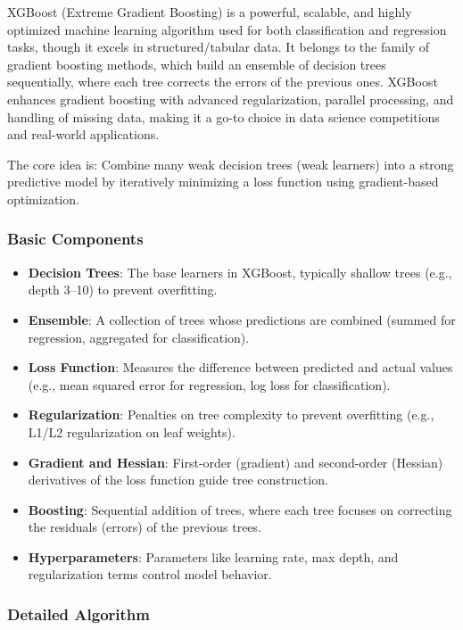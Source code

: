 XGBoost (Extreme Gradient Boosting) is a powerful, scalable, and highly optimized machine learning algorithm used for both classification and regression tasks, though it excels in structured/tabular data.
It belongs to the family of gradient boosting methods, which build an ensemble of decision trees sequentially, where each tree corrects the errors of the previous ones.
XGBoost enhances gradient boosting with advanced regularization, parallel processing, and handling of missing data, making it a go-to choice in data science competitions and real-world applications.

The core idea is: Combine many weak decision trees (weak learners) into a strong predictive model by iteratively minimizing a loss function using gradient-based optimization.

\subsubsection{Basic Components}
\begin{itemize}
    \item \textbf{Decision Trees}: The base learners in XGBoost, typically shallow trees (e.g., depth 3–10) to prevent overfitting.
    \item \textbf{Ensemble}: A collection of trees whose predictions are combined (summed for regression, aggregated for classification).
    \item \textbf{Loss Function}: Measures the difference between predicted and actual values (e.g., mean squared error for regression, log loss for classification).
    \item \textbf{Regularization}: Penalties on tree complexity to prevent overfitting (e.g., L1/L2 regularization on leaf weights).
    \item \textbf{Gradient and Hessian}: First-order (gradient) and second-order (Hessian) derivatives of the loss function guide tree construction.
    \item \textbf{Boosting}: Sequential addition of trees, where each tree focuses on correcting the residuals (errors) of the previous trees.
    \item \textbf{Hyperparameters}: Parameters like learning rate, max depth, and regularization terms control model behavior.
\end{itemize}

\subsubsection{Detailed Algorithm}

